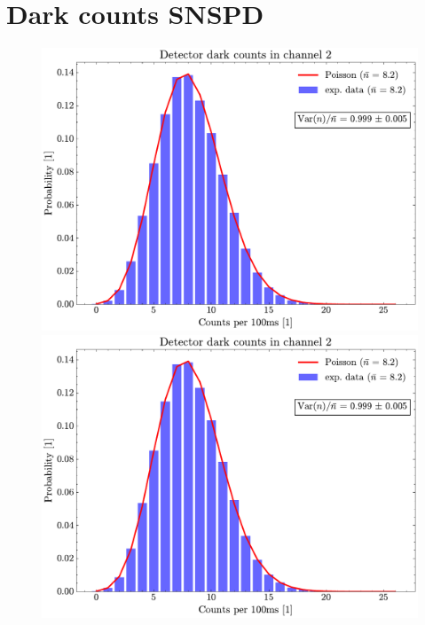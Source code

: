 \section*{Dark counts SNSPD}
\begin{figure}[h!]
	\centering
	\begin{minipage}[t]{\textwidth}
		\centering
		\includegraphics[page=1,width=.8\linewidth]{Images/DC_chAll.pdf}
	\end{minipage}
	
	
	\begin{minipage}[t]{\textwidth}
		\centering
		\includegraphics[page=2,width=.8\linewidth]{Images/DC_chAll.pdf}
	\end{minipage}
	
	

\end{figure}
